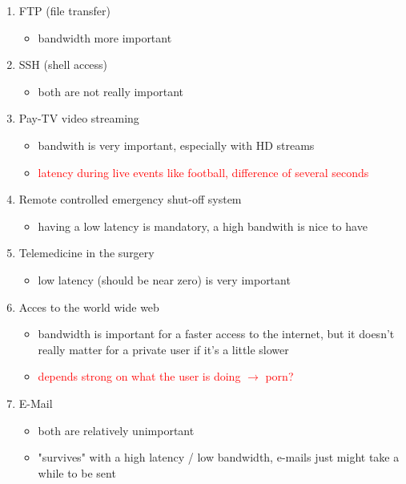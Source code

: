 \documentclass[a4paper,12pt]{article}
\begin{document}
	
	\begin{enumerate}[itemsep=0pt]
		\item FTP (file transfer)
		\begin{itemize}[itemsep=0pt]
			\item bandwidth more important
		\end{itemize} 
		\item SSH (shell access)
		\begin{itemize}[itemsep=0pt]
			\item both are not really important
		\end{itemize}  
		\item Pay-TV video streaming
		\begin{itemize}[itemsep=0pt]
			\item bandwith is very important, especially with HD streams
			\item \textcolor{red}{latency during live events like football, difference of several seconds}
		\end{itemize}  
		\item Remote controlled emergency shut-off system
		\begin{itemize}[itemsep=0pt]
			\item having a low latency is mandatory, a high bandwith is nice to have
		\end{itemize}
		\item Telemedicine in the surgery
		\begin{itemize}[itemsep=0pt]
			\item low latency (should be near zero) is very important
		\end{itemize}
		\item Acces to the world wide web
		\begin{itemize}[itemsep=0pt]
			\item bandwidth is important for a faster access to the internet, but it doesn't really matter for a private user if it's a little slower
			\item \textcolor{red}{depends strong on what the user is doing $\rightarrow$ porn?}
		\end{itemize}
		\item E-Mail
		\begin{itemize}[itemsep=0pt]
			\item both are relatively unimportant
			\item "survives" with a high latency / low bandwidth, e-mails just might take a while to be sent
		\end{itemize}
	\end{enumerate}
	
\end{document}
